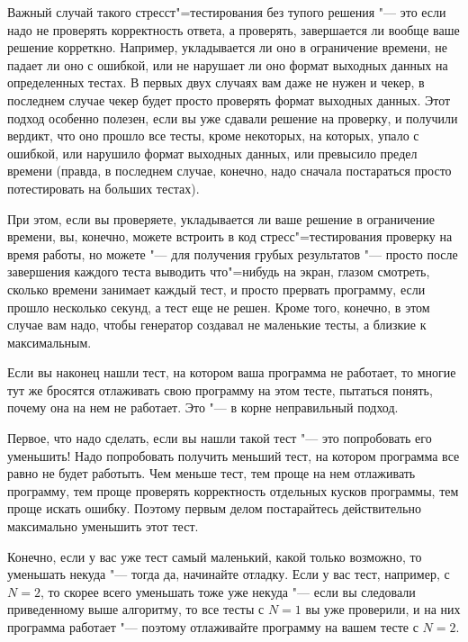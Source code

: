 \documentclass[a4paper,10pt]{problems}
\begin{document}
Важный случай такого стресст"=тестирования без тупого решения "--- это если надо не проверять корректность ответа, а проверять, 
завершается ли вообще ваше решение корреткно. 
Например, укладывается ли оно в ограничение времени, не падает ли оно с ошибкой, или не нарушает ли оно формат выходных данных на определенных тестах.
В первых двух случаях вам даже не нужен и чекер, в последнем случае чекер будет просто проверять формат выходных данных.
Этот подход особенно полезен, если вы уже сдавали решение на проверку, и получили вердикт, что оно прошло все тесты, кроме некоторых,
на которых, упало с ошибкой, или нарушило формат выходных данных, или превысило предел времени (правда, в последнем случае, конечно,
надо сначала постараться просто потестировать на больших тестах).

При этом, если вы проверяете, укладывается ли ваше решение в ограничение времени, вы, конечно, можете встроить в код стресс"=тестирования
проверку на время работы, но можете "--- для получения грубых результатов "--- просто после завершения каждого теста выводить что"=нибудь
на экран, глазом смотреть, сколько времени занимает каждый тест, и просто прервать программу, если прошло несколько секунд,
а тест еще не решен. 
Кроме того, конечно, в этом случае вам надо, чтобы генератор создавал не маленькие тесты, а близкие к максимальным.

Если вы наконец нашли тест, на котором ваша программа не работает, то многие тут же бросятся отлаживать свою программу на этом тесте, 
пытаться понять, почему она на нем не работает. Это "--- в корне неправильный подход.

Первое, что надо сделать, если вы нашли такой тест "--- это попробовать его уменьшить! 
Надо попробовать получить меньший тест, на котором программа все равно не будет работыть. 
Чем меньше тест, тем проще на нем отлаживать программу, тем проще проверять корректность отдельных кусков программы, тем проще искать ошибку. 
Поэтому первым делом постарайтесь действительно максимально уменьшить этот тест.

Конечно, если у вас уже тест самый маленький, какой только возможно, то уменьшать некуда "--- тогда да, начинайте отладку. 
Если у вас тест, например, с $N=2$, то скорее всего уменьшать тоже уже некуда "--- если вы следовали приведенному выше алгоритму,
то все тесты с $N=1$ вы уже проверили, и на них программа работает "--- поэтому отлаживайте программу на вашем тесте с $N=2$.
\end{document}
